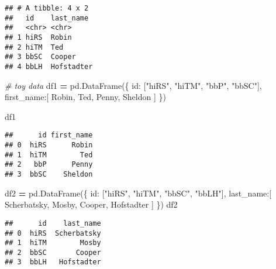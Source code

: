 \documentclass[
]{book}
\newenvironment{Shaded}{\begin{snugshade}}{\end{snugshade}}
\newcommand{\CommentTok}[1]{\textcolor[rgb]{0.56,0.35,0.01}{\textit{#1}}}
\newcommand{\NormalTok}[1]{#1}
\newcommand{\OperatorTok}[1]{\textcolor[rgb]{0.81,0.36,0.00}{\textbf{#1}}}
\newcommand{\StringTok}[1]{\textcolor[rgb]{0.31,0.60,0.02}{#1}}
\begin{document}
\begin{verbatim}
## # A tibble: 4 x 2
##   id    last_name 
##   <chr> <chr>     
## 1 hiRS  Robin     
## 2 hiTM  Ted       
## 3 bbSC  Cooper    
## 4 bbLH  Hofstadter
\end{verbatim}

\begin{Shaded}
\begin{Highlighting}[]
\CommentTok{\# toy data}
\NormalTok{df1 }\OperatorTok{=}\NormalTok{ pd.DataFrame(\{}
    \StringTok{\textquotesingle{}id\textquotesingle{}}\NormalTok{: [}\StringTok{"hiRS"}\NormalTok{, }\StringTok{"hiTM"}\NormalTok{,}
           \StringTok{"bbP"}\NormalTok{, }\StringTok{"bbSC"}\NormalTok{],}
    \StringTok{\textquotesingle{}first\_name\textquotesingle{}}\NormalTok{:[}
        \StringTok{\textquotesingle{}Robin\textquotesingle{}}\NormalTok{,}
        \StringTok{\textquotesingle{}Ted\textquotesingle{}}\NormalTok{,}
        \StringTok{\textquotesingle{}Penny\textquotesingle{}}\NormalTok{,}
        \StringTok{\textquotesingle{}Sheldon\textquotesingle{}}
\NormalTok{    ]}
\NormalTok{\})}

\NormalTok{df1}
\end{Highlighting}
\end{Shaded}

\begin{verbatim}
##      id first_name
## 0  hiRS      Robin
## 1  hiTM        Ted
## 2   bbP      Penny
## 3  bbSC    Sheldon
\end{verbatim}

\begin{Shaded}
\begin{Highlighting}[]
\NormalTok{df2 }\OperatorTok{=}\NormalTok{ pd.DataFrame(\{}
    \StringTok{\textquotesingle{}id\textquotesingle{}}\NormalTok{: [}\StringTok{"hiRS"}\NormalTok{, }\StringTok{"hiTM"}\NormalTok{,}
           \StringTok{"bbSC"}\NormalTok{, }\StringTok{"bbLH"}\NormalTok{],}
    \StringTok{\textquotesingle{}last\_name\textquotesingle{}}\NormalTok{:[}
        \StringTok{\textquotesingle{}Scherbatsky\textquotesingle{}}\NormalTok{,}
        \StringTok{\textquotesingle{}Mosby\textquotesingle{}}\NormalTok{,}
        \StringTok{\textquotesingle{}Cooper\textquotesingle{}}\NormalTok{,}
        \StringTok{\textquotesingle{}Hofstadter\textquotesingle{}}
\NormalTok{    ]}
\NormalTok{\})}
\NormalTok{df2}
\end{Highlighting}
\end{Shaded}

\begin{verbatim}
##      id    last_name
## 0  hiRS  Scherbatsky
## 1  hiTM        Mosby
## 2  bbSC       Cooper
## 3  bbLH   Hofstadter
\end{verbatim}
\end{document}
